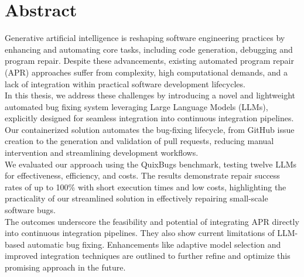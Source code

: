 \thispagestyle{empty}

\section*{Abstract}
Generative artificial intelligence is reshaping software engineering practices by enhancing and automating core tasks, including code generation, debugging and program repair. Despite these advancements, existing automated program repair (APR) approaches suffer from complexity, high computational demands, and a lack of integration within practical software development lifecycles.
\\
In this thesis, we address these challenges by introducing a novel and lightweight automated bug fixing system leveraging Large Language Models (LLMs), explicitly designed for seamless integration into continuous integration pipelines. Our containerized solution automates the bug-fixing lifecycle, from GitHub issue creation to the generation and validation of pull requests, reducing manual intervention and streamlining development workflows.\\
We evaluated our approach using the QuixBugs benchmark, testing twelve LLMs for effectiveness, efficiency, and costs. The results demonstrate repair success rates of up to 100\% with short execution times and low costs, highlighting the practicality of our streamlined solution in effectively repairing small-scale software bugs.
\\
The outcomes underscore the feasibility and potential of integrating APR directly into continuous integration pipelines. They also show current limitations of LLM-based automatic bug fixing. Enhancements like adaptive model selection and improved integration techniques are outlined to further refine and optimize this promising approach in the future.
